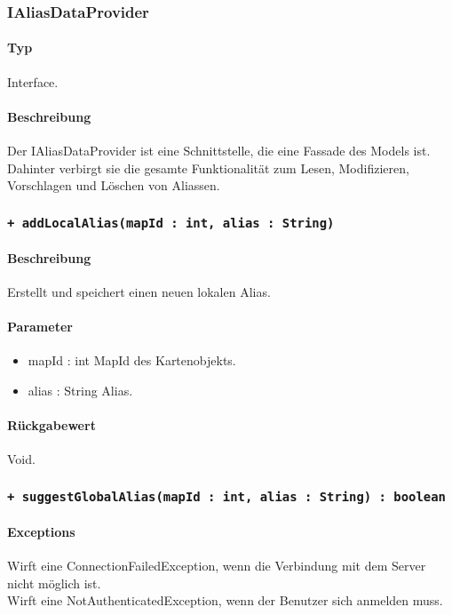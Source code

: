 \subsubsection{IAliasDataProvider}
\paragraph*{Typ}
Interface.
\paragraph*{Beschreibung}
Der IAliasDataProvider ist eine Schnittstelle, die eine Fassade des Models ist. 
Dahinter verbirgt sie die gesamte Funktionalität zum Lesen, Modifizieren, Vorschlagen und Löschen von Aliassen.

\subsubsection*{\texttt{+ addLocalAlias(mapId : int, alias : String)}}%
\paragraph*{Beschreibung}
Erstellt und speichert einen neuen lokalen Alias.
\paragraph*{Parameter}
\begin{itemize}
    \item mapId : int MapId des Kartenobjekts.
    \item alias : String Alias.
\end{itemize}
\paragraph*{Rückgabewert}
Void.

\subsubsection*{\texttt{+ suggestGlobalAlias(mapId : int, alias : String) : boolean}}%
\paragraph*{Exceptions}
Wirft eine ConnectionFailedException, wenn die Verbindung mit dem Server nicht möglich ist.\\
Wirft eine NotAuthenticatedException, wenn der Benutzer sich anmelden muss.
